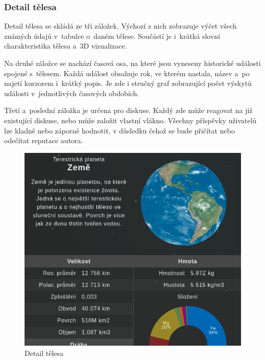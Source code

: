 \documentclass[a4paper,12pt]{article}
\begin{document}
\vspace*{-1cm}
\subsubsection{Detail tělesa}

Detail tělesa se skládá ze tří záložek. Výchozí z nich zobrazuje výčet všech známých údajů v~tabulce o~daném tělese. Součástí je i~krátká slovní charakteristika tělesa a~3D vizualizace.

Na druhé záložce se nachází časová osa, na které jsou vyneseny historické události spojené s~tělesem. Každá událost obsahuje rok, ve kterém nastala, název a~po najetí kurzorem  i~krátký popis. Je zde i stručný graf zobrazující počet výskytů události v~jednotlivých časových obdobích.

Třetí a~poslední záložka je určena pro diskuse. Každý zde může reagovat na již existující diskuse, nebo může založit vlastní vlákno. Všechny příspěvky uživatelů lze kladně nebo záporně hodnotit, v důsledku čehož se bude přičítat nebo odečítat reputace autora.

\begin{figure}[H]
\begin{center}
\includegraphics[width=350pt]{Images/Body.png}
\caption{Detail tělesa}
\end{center}
\end{figure}
\end{document}
